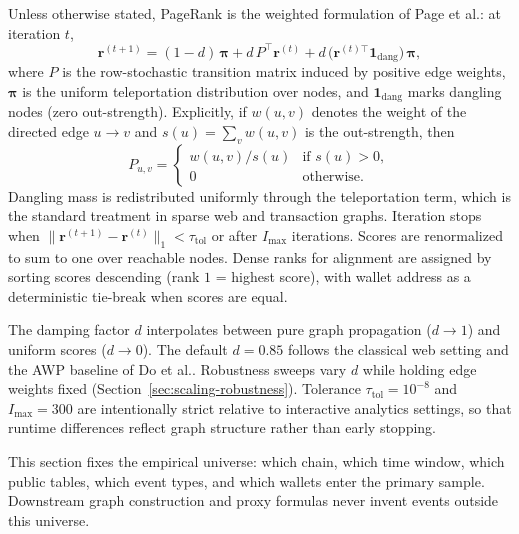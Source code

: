 Unless otherwise stated, PageRank is the weighted formulation of Page et al.: at iteration $t$,
\begin{equation}
\label{eq:pagerank}
\mathbf{r}^{(t+1)}
=
(1-d)\,\boldsymbol{\pi}
+
d\,P^{\top}\mathbf{r}^{(t)}
+
d\,\bigl(\mathbf{r}^{(t)\top}\mathbf{1}_{\mathrm{dang}}\bigr)\,\boldsymbol{\pi},
\end{equation}
where $P$ is the row-stochastic transition matrix induced by positive edge weights, $\boldsymbol{\pi}$ is the uniform teleportation distribution over nodes, and $\mathbf{1}_{\mathrm{dang}}$ marks dangling nodes (zero out-strength). Explicitly, if $w(u,v)$ denotes the weight of the directed edge $u\to v$ and $s(u)=\sum_v w(u,v)$ is the out-strength, then
\begin{equation}
\label{eq:transition-impl}
P_{u,v}
=
\begin{cases}
w(u,v)/s(u) & \text{if }s(u)>0,\\
0 & \text{otherwise.}
\end{cases}
\end{equation}
Dangling mass is redistributed uniformly through the teleportation term, which is the standard treatment in sparse web and transaction graphs. Iteration stops when $\|\mathbf{r}^{(t+1)}-\mathbf{r}^{(t)}\|_1 < \tau_{\mathrm{tol}}$ or after $I_{\max}$ iterations. Scores are renormalized to sum to one over reachable nodes. Dense ranks for alignment are assigned by sorting scores descending (rank $1$ = highest score), with wallet address as a deterministic tie-break when scores are equal.

The damping factor $d$ interpolates between pure graph propagation ($d\to 1$) and uniform scores ($d\to 0$). The default $d=0.85$ follows the classical web setting and the AWP baseline of Do et al.. Robustness sweeps vary $d$ while holding edge weights fixed (Section~\ref{sec:scaling-robustness}). Tolerance $\tau_{\mathrm{tol}}=10^{-8}$ and $I_{\max}=300$ are intentionally strict relative to interactive analytics settings, so that runtime differences reflect graph structure rather than early stopping.


This section fixes the empirical universe: which chain, which time window, which public tables, which event types, and which wallets enter the primary sample. Downstream graph construction and proxy formulas never invent events outside this universe.

